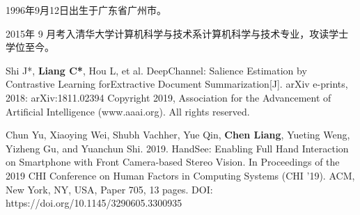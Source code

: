 \begin{resume}


  1996年9月12日出生于广东省广州市。

  2015年 9 月考入清华大学计算机科学与技术系计算机科学与技术专业，攻读学士学位至今。


  \begin{publications}
    \item Shi J*, \textbf{Liang C*}, Hou L, et al. DeepChannel: Salience Estimation by Contrastive Learning forExtractive Document Summarization[J]. arXiv e-prints, 2018: arXiv:1811.02394  Copyright 2019, Association for the Advancement of Artificial Intelligence (www.aaai.org). All rights reserved.
    \item Chun Yu, Xiaoying Wei, Shubh Vachher, Yue Qin, \textbf{Chen Liang}, Yueting Weng, Yizheng Gu, and Yuanchun Shi. 2019. HandSee: Enabling Full Hand Interaction on Smartphone with Front Camera-based Stereo Vision. In Proceedings of the 2019 CHI Conference on Human Factors in Computing Systems (CHI '19). ACM, New York, NY, USA, Paper 705, 13 pages. DOI: https://doi.org/10.1145/3290605.3300935
  \end{publications}

\end{resume}

